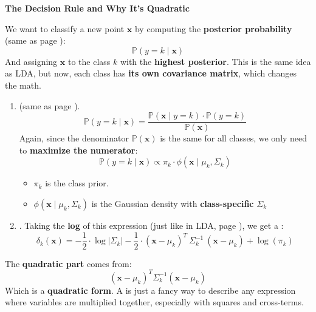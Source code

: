 \begin{flushleft}
    \textcolor{Green3}{ \textbf{The Decision Rule and Why It's Quadratic}}
\end{flushleft}
We want to classify a new point $\mathbf{x}$ by computing the \textbf{posterior probability} (same as page \pageref{eq: posterior probability}):
\begin{equation*}
    \mathbb{P}\left(y = k \mid \mathbf{x}\right)
\end{equation*}
And assigning $\mathbf{x}$ to the class $k$ with the \textbf{highest posterior}. This is the same idea as LDA, but now, each class has \textbf{its own covariance matrix}, which changes the math.
\begin{enumerate}
    \item {} (same as page \pageref{eq: bayes rule - lda}).
    \begin{equation*}
        \mathbb{P}\left(y = k \mid \mathbf{x}\right) = \dfrac{\mathbb{P}\left(\mathbf{x} \mid y = k\right) \cdot \mathbb{P}\left(y = k\right)}{\mathbb{P}\left(\mathbf{x}\right)}
    \end{equation*}
    Again, since the denominator $\mathbb{P}\left(\mathbf{x}\right)$ is the same for all classes, we only need to \textbf{maximize the numerator}:
    \begin{equation*}
        \mathbb{P}\left(y = k \mid \mathbf{x}\right) \propto \pi_{k} \cdot \phi\left(\mathbf{x} \mid \mu_{k}, \Sigma_{k}\right)
    \end{equation*}
    \begin{itemize}
        \item $\pi_{k}$ is the class prior.
        \item $\phi\left(\mathbf{x} \mid \mu_{k}, \Sigma_{k}\right)$ is the Gaussian density with \textbf{class-specific} $\Sigma_{k}$
    \end{itemize}


    \item {}. Taking the \textbf{log} of this expression (just like in LDA, page \pageref{eq: discriminant function - lda}), we get a :
    \begin{equation}
        \delta_k(\mathbf{x}) = -\dfrac{1}{2} \cdot \log \left|\Sigma_k\right| - \dfrac{1}{2} \cdot \left(\mathbf{x} - \mu_{k}\right)^{T} \: \Sigma_{k}^{-1} \: \left(\mathbf{x} - \mu_{k}\right) + \log\left(\pi_{k}\right)
    \end{equation}
\end{enumerate}
The \textbf{quadratic part} comes from:
\begin{equation*}
    \left(\mathbf{x} - \mu_{k}\right)^{T} \Sigma_k^{-1} \left(\mathbf{x} - \mu_{k}\right)
\end{equation*}
Which is a \textbf{quadratic form}. A  is just a fancy way to describe any expression where variables are multiplied together, especially with squares and cross-terms.

